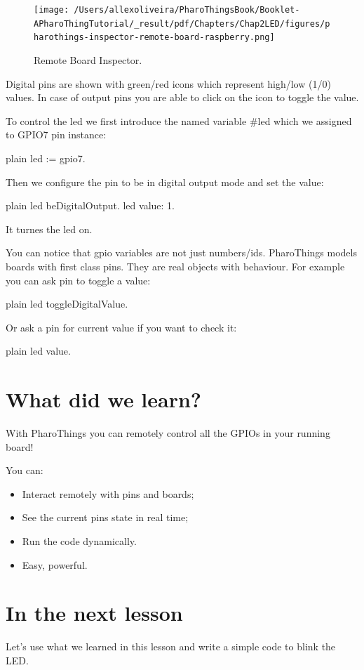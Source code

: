 \documentclass[10pt,twoside,english]{_support/latex/sbabook/sbabook}
\begin{document}
\begin{figure}

\begin{center}
\texttt{[image: /Users/allexoliveira/PharoThingsBook/Booklet-APharoThingTutorial/\_result/pdf/Chapters/Chap2LED/figures/pharothings-inspector-remote-board-raspberry.png]}\caption{Remote Board Inspector.\label{remoteBoard}}\end{center}
\end{figure}


Digital pins are shown with green/red icons which represent high/low (1/0) values. In case of output pins you are able to click on the icon to toggle the value.

To control the led we first introduce the named variable \#led which we assigned to GPIO7 pin instance:

\begin{displaycode}{plain}
led := gpio7.
\end{displaycode}

Then we configure the pin to be in digital output mode and set the value:

\begin{displaycode}{plain}
led beDigitalOutput.
led value: 1.
\end{displaycode}

It turnes the led on.

You can notice that gpio variables are not just numbers/ids. PharoThings models boards with first class pins. They are real objects with behaviour. For example you can ask pin to toggle a value:

\begin{displaycode}{plain}
led toggleDigitalValue.
\end{displaycode}

Or ask a pin for current value if you want to check it:

\begin{displaycode}{plain}
led value.
\end{displaycode}
\section{What did we learn?}
With PharoThings you can remotely control all the GPIOs in your running board!

You can:

\begin{itemize}
\item Interact remotely with pins and boards;
\item See the current pins state in real time;
\item Run the code dynamically.
\item Easy, powerful.
\end{itemize}
\section{In the next lesson}
Let’s use what we learned in this lesson and write a simple code to blink the LED.


\backmatter

\end{document}
